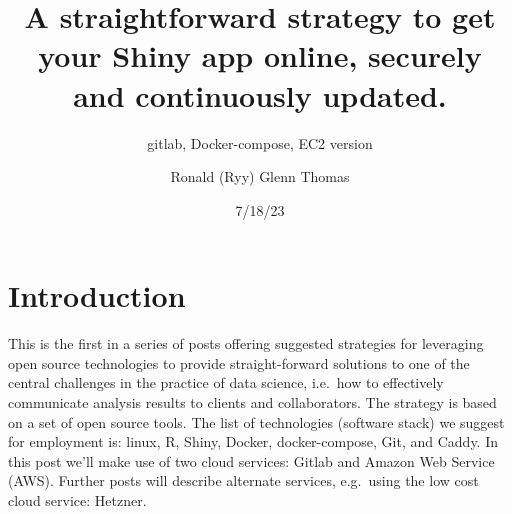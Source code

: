 \documentclass[
  letterpaper,
  DIV=11,
  numbers=noendperiod,
  oneside]{scrartcl}
\title{A straightforward strategy to get your Shiny app online, securely
and continuously updated.}
\subtitle{gitlab, Docker-compose, EC2 version}
\author{Ronald (Ryy) Glenn Thomas}
\date{7/18/23}
\renewcommand*\contentsname{Table of contents}
\newcommand\contentsname{Table of contents}
\begin{document}
\maketitle
\ifdefined\Shaded\renewenvironment{Shaded}{\begin{tcolorbox}[borderline west={3pt}{0pt}{shadecolor}, frame hidden, interior hidden, enhanced, boxrule=0pt, breakable, sharp corners]}{\end{tcolorbox}}\fi

\renewcommand*\contentsname{Table of contents}
{
\hypersetup{linkcolor=}
\setcounter{tocdepth}{3}
\tableofcontents
}

\hypertarget{introduction}{%
\section{Introduction}\label{introduction}}

This is the first in a series of posts offering suggested strategies for
leveraging open source technologies to provide straight-forward
solutions to one of the central challenges in the practice of data
science, i.e.~how to effectively communicate analysis results to clients
and collaborators. The strategy is based on a set of open source tools.
The list of technologies (software stack) we suggest for employment is:
linux, R, Shiny, Docker, docker-compose, Git, and Caddy. In this post
we'll make use of two cloud services: Gitlab and Amazon Web Service
(AWS). Further posts will describe alternate services, e.g.~using the
low cost cloud service: Hetzner.
\end{document}
